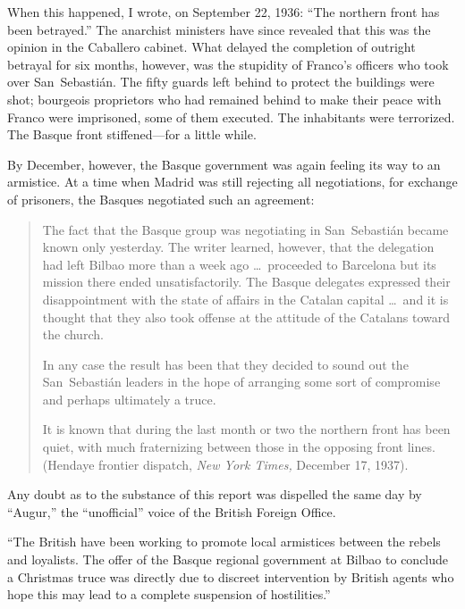 When this happened, I wrote, on September 22, 1936: ``The northern front has been betrayed.'' The anarchist ministers have since revealed that this was the opinion in the Caballero cabinet. What delayed the completion of outright betrayal for six months, however, was the stupidity of Franco’s officers who took over San~Sebasti\'an. The fifty guards left behind to protect the buildings were shot; bourgeois proprietors who had remained behind to make their peace with Franco were imprisoned, some of them executed. The inhabitants were terrorized. The Basque front stiffened---for a little while.

By December, however, the Basque government was again feeling its way to an armistice. At a time when Madrid was still rejecting all negotiations, for exchange of prisoners, the Basques negotiated such an agreement:

\begin{quotation}
  \indexNYT{}
  
  The fact that the Basque group was negotiating in San~Sebasti\'an became known only yesterday. The writer learned, however, that the delegation had left Bilbao more than a week ago \dots\ proceeded to Barcelona but its mission there ended unsatisfactorily. The Basque delegates expressed their disappointment with the state of affairs in the Catalan capital \dots\ and it is thought that they also took offense at the attitude of the Catalans toward the church.
  
  In any case the result has been that they decided to sound out the San~Sebasti\'an leaders in the hope of arranging some sort of compromise and perhaps ultimately a truce.
  
  It is known that during the last month or two the northern front has been quiet, with much fraternizing between those in the opposing front lines. (Hendaye frontier dispatch, \emph{New York Times,} December 17, 1937).
\end{quotation}

Any doubt as to the substance of this report was dispelled the same day by ``Augur,'' the ``unofficial'' voice of the British Foreign Office.

``The British have been working to promote local armistices between the rebels and loyalists. The offer of the Basque regional government at Bilbao to conclude a Christmas truce was directly due to discreet intervention by British agents who hope this may lead to a complete suspension of hostilities.''

